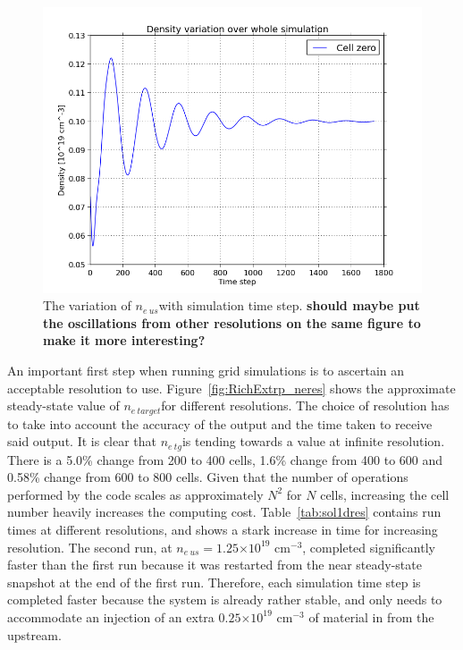 \documentclass[11pt, twocolumn]{article}  %
\providecommand{\e}[1]{\ensuremath{\times 10^{#1}}} %
\providecommand{\neus}{$n_{e~us}$} %
\providecommand{\netarget}{$n_{e~target}$} %
\providecommand{\netg}{$n_{e~tg}$} %
\begin{document}
\begin{figure}
\includegraphics[scale=0.4]{Figures/sol1d/ne_var_ny=800.png}
\centering
\caption{The variation of \neus with simulation time step. \textbf{should maybe put the oscillations from other resolutions on the same figure to make it more interesting?}}\label{fig:ne_var_ny=800}
\end{figure}

An important first step when running grid simulations is to ascertain an acceptable resolution to use. Figure~\ref{fig:RichExtrp_neres} shows the approximate steady-state value of \netarget for different resolutions. The choice of resolution has to take into account the accuracy of the output and the time taken to receive said output. It is clear that \netg is tending towards a value at infinite resolution. There is a 5.0\% change from 200 to 400 cells, 1.6\% change from 400 to 600 and 0.58\% change from 600 to 800 cells. Given that the number of operations performed by the code scales as approximately $N^2$ for $N$ cells, increasing the cell number heavily increases the computing cost. Table~\ref{tab:sol1dres} contains run times at different resolutions, and shows a stark increase in time for increasing resolution. The second run, at \neus $= 1.25\e{19}$ cm$^{-3}$, completed significantly faster than the first run because it was restarted from the near steady-state snapshot at the end of the first run. Therefore, each simulation time step is completed faster because the system is already rather stable, and only needs to accommodate an injection of an extra $0.25\e{19}$ cm$^{-3}$ of material in from the upstream.
\end{document}
